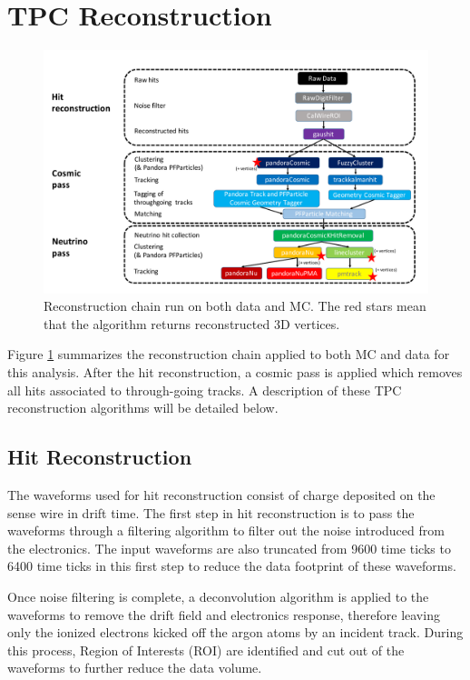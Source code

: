 \section{TPC Reconstruction}
\begin{figure}[htp!]
\includegraphics[width=\textwidth]{figs/reconstructionchain.png}
\caption{Reconstruction chain run on both data and MC. The red stars mean that the algorithm returns reconstructed 3D vertices.}
\label{fig:recochain}
\end{figure}

Figure \ref{fig:recochain} summarizes the reconstruction chain applied to both MC and data for this analysis. After the hit reconstruction, a cosmic pass is applied which removes all hits associated to through-going tracks. A description of these TPC reconstruction algorithms will be detailed below.
\subsection{Hit Reconstruction}
The waveforms used for hit reconstruction consist of charge deposited on the sense wire in drift time. The first step in hit reconstruction is to pass the waveforms through a filtering algorithm to filter out the noise introduced from the electronics. The input waveforms are also truncated from 9600 time ticks to 6400 time ticks in this first step to reduce the data footprint of these waveforms. 

Once noise filtering is complete, a deconvolution algorithm is applied to the waveforms to remove the drift field and electronics response, therefore leaving only the ionized electrons kicked off the argon atoms by an incident track. During this process, Region of Interests (ROI) are identified and cut out of the waveforms to further reduce the data volume. 

